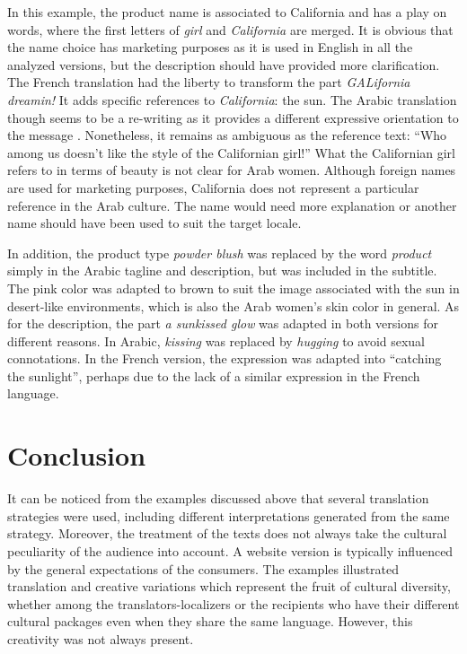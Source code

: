 \documentclass[output=paper]{langsci/langscibook}
\begin{document}
In this example, the product name is associated to California and has a play on words, where the first letters of \textit{girl} and \textit{California} are merged. It is obvious that the name choice has marketing purposes as it is used in English in all the analyzed versions, but the description should have provided more clarification. The French translation had the liberty to transform the part \textit{GALifornia dreamin!} It adds specific references to \textit{California}: the sun. The Arabic translation though seems to be a re-writing as it provides a different expressive orientation to the message \parencite[129]{guidere00}. Nonetheless, it remains as ambiguous as the reference text: \enquote{Who among us doesn’t like the style of the Californian girl!} What the Californian girl refers to in terms of beauty is not clear for Arab women. Although foreign names are used for marketing purposes, California does not represent a particular reference in the Arab culture. The name would need more explanation or another name should have been used to suit the target locale.

In addition, the product type \textit{powder blush} was replaced by the word \textit{product} simply in the Arabic tagline and description, but was included in the subtitle. The pink color was adapted to brown to suit the image associated with the sun in desert-like environments, which is also the Arab women’s skin color in general. As for the description, the part \textit{a sunkissed glow} was adapted in both versions for different reasons. In Arabic, \textit{kissing} was replaced by \textit{hugging} to avoid sexual connotations. In the French version, the expression was adapted into \enquote{catching the sunlight}, perhaps due to the lack of a similar expression in the French language.

\section{Conclusion}

It can be noticed from the examples discussed above that several translation strategies were used, including different interpretations generated from the same strategy. Moreover, the treatment of the texts does not always take the cultural peculiarity of the audience into account. A website version is typically influenced by the general expectations of the consumers. The examples illustrated translation and creative variations which represent the fruit of cultural diversity, whether among the translators-localizers or the recipients who have their different cultural packages even when they share the same language. However, this creativity was not always present.
\end{document}
